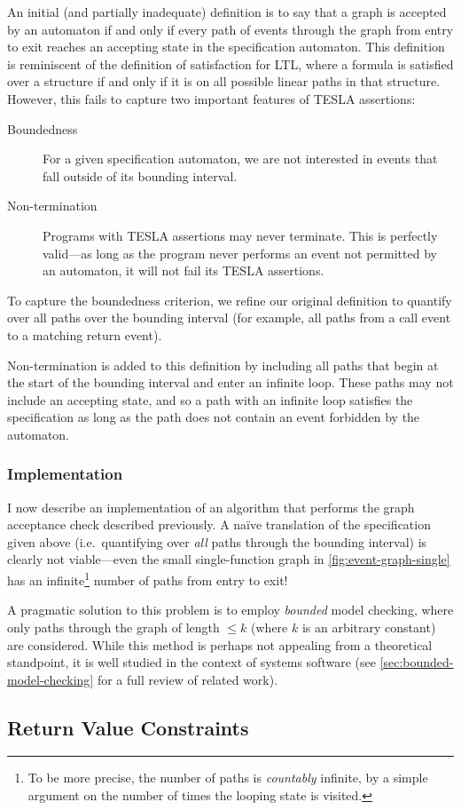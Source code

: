 An initial (and partially inadequate) definition is to say that a graph is
accepted by an automaton if and only if every path of events through the graph
from entry to exit reaches an accepting state in the specification automaton.
This definition is reminiscent of the definition of satisfaction for LTL, where
a formula is satisfied over a structure if and only if it is on all possible
linear paths in that structure. However, this fails to capture two important
features of TESLA assertions:
\begin{description}
  \item[Boundedness] For a given specification automaton, we are not interested
    in events that fall outside of its bounding interval.
  \item[Non-termination] Programs with TESLA assertions may never
    terminate. This is perfectly valid---as long as the program never
    performs an event not permitted by an automaton, it will not fail
    its TESLA assertions.
\end{description}

To capture the boundedness criterion, we refine our original definition to
quantify over all paths over the bounding interval (for example, all paths from
a call event to a matching return event).

Non-termination is added to this definition by including all paths that begin at
the start of the bounding interval and enter an infinite loop. These
paths may not include an accepting state, and so a path with an infinite
loop satisfies the specification as long as the path does not contain an
event forbidden by the automaton.

\subsubsection{Implementation}

I now describe an implementation of an algorithm that performs the graph
acceptance check described previously. A na\"ive translation of the
specification given above (i.e.\ quantifying over \emph{all} paths
through the bounding interval) is clearly not viable---even the
small single-function graph in \autoref{fig:event-graph-single} has an
infinite\footnote{To be more precise, the number of paths is
\emph{countably} infinite, by a simple argument on the number of times
the looping state is visited.} number of paths from entry to exit!

A pragmatic solution to this problem is to employ \emph{bounded} model
checking, where only paths through the graph of length $ \leq k $ (where
$k$ is an arbitrary constant) are considered. While this method is
perhaps not appealing from a theoretical standpoint, it is well studied
in the context of systems software (see
\autoref{sec:bounded-model-checking} for a full review of related work).

\subsection{Return Value Constraints} \label{sec:rvc}
